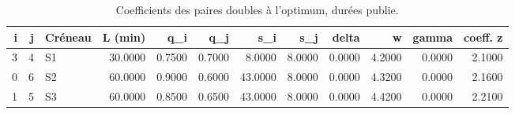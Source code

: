 \begin{table}[htbp]
\caption{Coefficients des paires doubles à l'optimum, durées publie.}
\label{tab:pairs-publie}
\begin{tabular}{rrlrrrrrrrrr}
\toprule
i & j & Créneau & L (min) & q\_i & q\_j & s\_i & s\_j & delta & w & gamma & coeff. z \\
\midrule
3 & 4 & S1 & 30.0000 & 0.7500 & 0.7000 & 8.0000 & 8.0000 & 0.0000 & 4.2000 & 0.0000 & 2.1000 \\
0 & 6 & S2 & 60.0000 & 0.9000 & 0.6000 & 43.0000 & 8.0000 & 0.0000 & 4.3200 & 0.0000 & 2.1600 \\
1 & 5 & S3 & 60.0000 & 0.8500 & 0.6500 & 43.0000 & 8.0000 & 0.0000 & 4.4200 & 0.0000 & 2.2100 \\
\bottomrule
\end{tabular}
\end{table}
